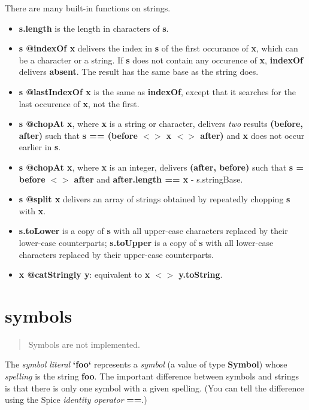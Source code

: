 \documentclass{report}
\begin{document}
There are many built-in functions on strings.

\begin{itemize}\item {\bf s.length} is the length in characters of {\bf s}.

\item {\bf s @indexOf x} delivers the index in {\bf s} of the first occurance of
{\bf x}, which can be a character or a string. If {\bf s} does not contain any
occurence of {\bf x}, {\bf indexOf} delivers {\bf absent}. The result has the same
base as the string does.

\item {\bf s @lastIndexOf x} is the same as {\bf indexOf}, except that it searches
for the last occurence of {\bf x}, not the first.

\item {\bf s @chopAt x}, where {\bf x} is a string or character, delivers {\em two}
results {\bf (before, after)} such that {\bf s == (before $<$$>$ x $<$$>$ after)} and
{\bf x} does not occur earlier in {\bf s}.

\item {\bf s @chopAt x}, where {\bf x} is an integer, delivers {\bf (after, before)}
such that {\bf s = before $<$$>$ after} and {\bf after.length == x} -
s.stringBase.

\item {\bf s @split x} delivers an array of strings obtained by repeatedly
chopping {\bf s} with {\bf x}.

\item {\bf s.toLower} is a copy of {\bf s} with all upper-case characters replaced
by their lower-case counterparts; {\bf s.toUpper} is a copy of {\bf s} with
all lower-case characters replaced by their upper-case counterparts.

\item {\bf x @catStringly y}: equivalent to {\bf x $<$$>$ y.toString}.

\end{itemize}

\section{symbols}


\begin{quote}Symbols are not implemented.\end{quote}

The {\em symbol literal} {\bf `foo`} represents a {\em symbol} (a value
of type {\bf Symbol}) whose {\em spelling} is the string {\bf foo}. The important
difference between symbols and strings is that there is only one
symbol with a given spelling. (You can tell the difference using the
Spice {\em identity operator} {\bf ==}.)
\end{document}
